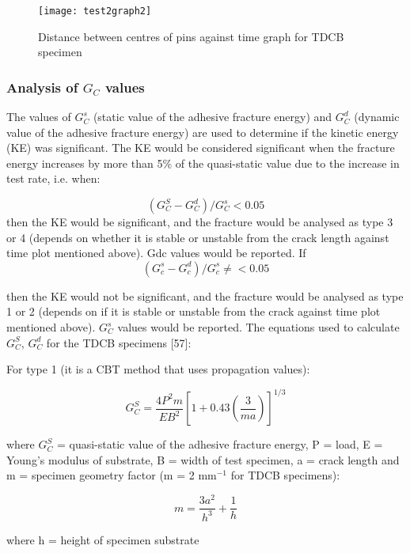 \documentclass[numbers=noendperiod,chapterprefix=on]{icldt} %
\begin{document}
\begin{figure}[!htpb]
\centering
\texttt{[image: test2graph2]}
\caption{Distance between centres of pins against time graph for TDCB specimen } %
\end{figure}

\subsubsection{Analysis of $G_C$ values}
The values of $G^s_C$ (static value of the adhesive fracture energy) and $G^d_C$ (dynamic value of the adhesive fracture energy) are used to determine if the kinetic energy (KE) was significant. The KE would be considered significant when the fracture energy increases by more than 5\% of the quasi-static value due to the increase in test rate, i.e. when: 

\begin{equation} 
(G_C^S  - G_C^d)/G_C^s< 0.05
\end{equation}
then the KE would be significant, and the fracture would be analysed as type 3 or 4 (depends on whether it is stable or unstable from the crack length against time plot mentioned above). Gdc values would be reported.
If
\begin{equation} 
(G_c^s  - G_c^d)/G_c^s\neq< 0.05
\end{equation}

then the KE would not be significant, and the fracture would be analysed as type 1 or 2 (depends on if it is stable or unstable from the crack against time plot mentioned above). $G^s_C$ values would be reported. The equations used to calculate $G^S_C$, $G^d_C$ for the TDCB specimens [57]: 

For type 1 (it is a CBT method that uses propagation values): 

\begin{equation} 
G_C^S= \frac{4P^2 m}{EB^2} \left[1+0.43\left( \frac{3}{ma}\right) \right] ^{1/3}
\end{equation}

where $G^S_C$ = quasi-static value of the adhesive fracture energy, P = load, E = Young’s modulus of substrate, B = width of test specimen, a = crack length and m = specimen geometry factor (m = 2 mm$^{-1}$ for TDCB specimens):


\begin{equation} 
m=\frac{3a^2}{h^3}+\frac{1}{h}
\end{equation}

where h = height of specimen substrate
\end{document}
